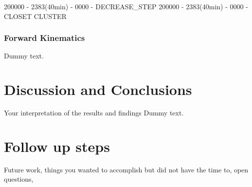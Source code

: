 \documentclass{article}
\begin{document}
200000 - 2383(40min) - 0000 - DECREASE_STEP
200000 - 2383(40min) - 0000 - CLOSET CLUSTER


\begin{frame}
\frametitle{Forward Kinematics}

\begin{center}
\end{center}
\end{frame}
Dummy text.

\section{Discussion and Conclusions}
Your interpretation of the results and findings
Dummy text. 


\section{Follow up steps}

Future work, things you wanted to accomplish but did not have the time to, open questions,

  
 
\end{document}
